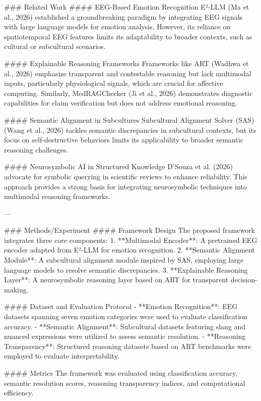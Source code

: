 ### Related Work  
#### EEG-Based Emotion Recognition  
E²-LLM (Ma et al., 2026) established a groundbreaking paradigm by integrating EEG signals with large language models for emotion analysis. However, its reliance on spatiotemporal EEG features limits its adaptability to broader contexts, such as cultural or subcultural scenarios.

#### Explainable Reasoning Frameworks  
Frameworks like ART (Wadhwa et al., 2026) emphasize transparent and contestable reasoning but lack multimodal inputs, particularly physiological signals, which are crucial for affective computing. Similarly, MedRAGChecker (Ji et al., 2026) demonstrates diagnostic capabilities for claim verification but does not address emotional reasoning.

#### Semantic Alignment in Subcultures  
Subcultural Alignment Solver (SAS) (Wang et al., 2026) tackles semantic discrepancies in subcultural contexts, but its focus on self-destructive behaviors limits its applicability to broader semantic reasoning challenges.

#### Neurosymbolic AI in Structured Knowledge  
D'Souza et al. (2026) advocate for symbolic querying in scientific reviews to enhance reliability. This approach provides a strong basis for integrating neurosymbolic techniques into multimodal reasoning frameworks.

---

### Methods/Experiment  
#### Framework Design  
The proposed framework integrates three core components:  
1. **Multimodal Encoder**: A pretrained EEG encoder adapted from E²-LLM for emotion recognition.  
2. **Semantic Alignment Module**: A subcultural alignment module inspired by SAS, employing large language models to resolve semantic discrepancies.  
3. **Explainable Reasoning Layer**: A neurosymbolic reasoning layer based on ART for transparent decision-making.

#### Dataset and Evaluation Protocol  
- **Emotion Recognition**: EEG datasets spanning seven emotion categories were used to evaluate classification accuracy.  
- **Semantic Alignment**: Subcultural datasets featuring slang and nuanced expressions were utilized to assess semantic resolution.  
- **Reasoning Transparency**: Structured reasoning datasets based on ART benchmarks were employed to evaluate interpretability.

#### Metrics  
The framework was evaluated using classification accuracy, semantic resolution scores, reasoning transparency indices, and computational efficiency.

